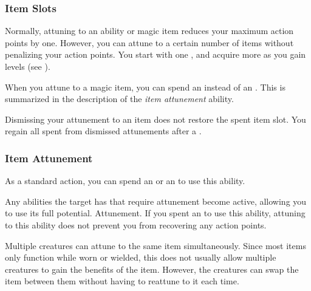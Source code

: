         \subsubsection{Item Slots}\label{Item Slots}
            Normally, attuning to an ability or magic item reduces your maximum action points by one.
            However, you can attune to a certain number of items without penalizing your action points.
            You start with one , and acquire more as you gain levels (see ).

            When you attune to a magic item, you can spend an  instead of an .
            This is summarized in the description of the \textit{item attunement} ability.

            Dismissing your attunement to an item does not restore the spent item slot.
            You regain all spent  from dismissed attunements after a .

        \subsubsection{Item Attunement}
            As a standard action, you can spend an  or an  to use this ability.
            \begin{ability}
                \begin{spelltargetinginfo}
                \end{spelltargetinginfo}
                \begin{spelleffects}
                    \spelleffect Any abilities the target has that require attunement become active, allowing you to use its full potential.
                    \spelldur Attunement. If you spent an  to use this ability, attuning to this ability does not prevent you from recovering any action points.
                \end{spelleffects}
            \end{ability}

            Multiple creatures can attune to the same item simultaneously.
            Since most items only function while worn or wielded, this does not usually allow multiple creatures to gain the benefits of the item.
            However, the creatures can swap the item between them without having to reattune to it each time.

